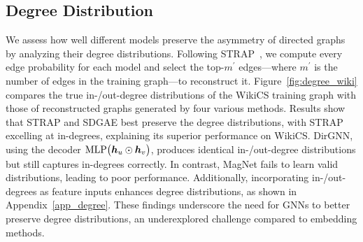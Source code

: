 \subsection{Degree Distribution}
We assess how well different models preserve the asymmetry of directed graphs by analyzing their degree distributions. Following STRAP~\cite{strap}, we compute every edge probability for each model and select the top-$m^{\prime}$ edges—where $m^{\prime}$ is the number of edges in the training graph—to reconstruct it. Figure~\ref{fig:degree_wiki} compares the true in-/out-degree distributions of the WikiCS training graph with those of reconstructed graphs generated by four various methods. Results show that STRAP and SDGAE best preserve the degree distributions, with STRAP excelling at in-degrees, explaining its superior performance on WikiCS. DirGNN, using the decoder $\mathrm{MLP}\bigl({\bm{h}}_u \odot {\bm{h}}_v\bigr)$, produces identical in-/out-degree distributions but still captures in-degrees correctly. In contrast, MagNet fails to learn valid distributions, leading to poor performance. Additionally, incorporating in-/out-degrees as feature inputs enhances degree distributions, as shown in Appendix~\ref{app_degree}. These findings underscore the need for GNNs to better preserve degree distributions, an underexplored challenge compared to embedding methods.




